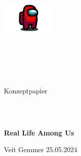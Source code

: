 \author{Veit Gemmer}
\date{\today}

\begin{center}
\includegraphics[height=1.5cm]{graphics/among_us.png}
\end{center}
\begin{verbatim}





\end{verbatim}
\begin{center}
    \Large{Konzeptpapier}
\end{center}
\begin{verbatim}



\end{verbatim}
\begin{center}
    \textbf{\Large{Real Life Among Us}}
\end{center}
\vfill
\begin{center}
    Veit Gemmer
    25.05.2024
    \begin{verbatim}



    \end{verbatim}
\end{center}
